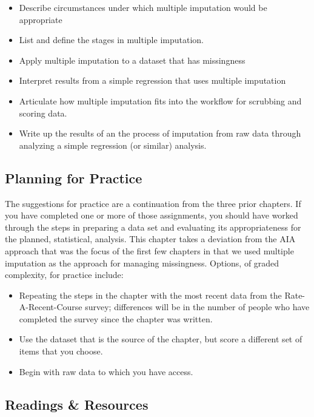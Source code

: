 \documentclass[
  english,
]{book}
\providecommand{\tightlist}{%
  \setlength{\itemsep}{0pt}\setlength{\parskip}{0pt}}
\begin{document}
\begin{itemize}
\tightlist
\item
  Describe circumstances under which multiple imputation would be appropriate
\item
  List and define the stages in multiple imputation.
\item
  Apply multiple imputation to a dataset that has missingness
\item
  Interpret results from a simple regression that uses multiple imputation
\item
  Articulate how multiple imputation fits into the workflow for scrubbing and scoring data.
\item
  Write up the results of an the process of imputation from raw data through analyzing a simple regression (or similar) analysis.
\end{itemize}

\hypertarget{planning-for-practice-3}{%
\subsection{Planning for Practice}\label{planning-for-practice-3}}

The suggestions for practice are a continuation from the three prior chapters. If you have completed one or more of those assignments, you should have worked through the steps in preparing a data set and evaluating its appropriateness for the planned, statistical, analysis. This chapter takes a deviation from the AIA \citep{parent_handling_2013} approach that was the focus of the first few chapters in that we used multiple imputation as the approach for managing missingness. Options, of graded complexity, for practice include:

\begin{itemize}
\tightlist
\item
  Repeating the steps in the chapter with the most recent data from the Rate-A-Recent-Course survey; differences will be in the number of people who have completed the survey since the chapter was written.
\item
  Use the dataset that is the source of the chapter, but score a different set of items that you choose.
\item
  Begin with raw data to which you have access.
\end{itemize}

\hypertarget{readings-resources-3}{%
\subsection{Readings \& Resources}\label{readings-resources-3}}
\end{document}

